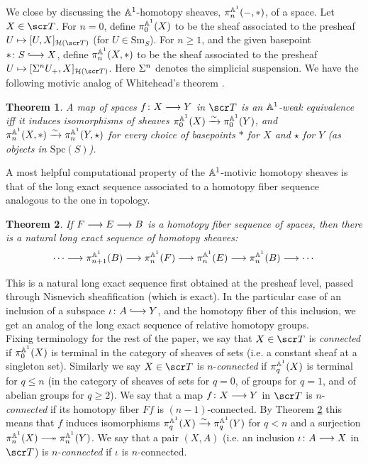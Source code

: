 \documentclass{amsart}
\newtheorem{thm}{Theorem}[section]
\theoremstyle{definition}
\begin{document}
We close by discussing the $\mathbb{A}^1$-homotopy sheaves, $\pi^{\mathbb{A}^1}_n(-,*)$, of a space. Let $X \in \sT$. For $n=0$, define $\pi_0^{\mathbb{A}^1}(X)$ to be the sheaf associated to the presheaf $U \mapsto [U,X]_{\oH(\sT)}$ (for $U \in \mathrm{Sm}_S$). For $n \geq 1$, and the given basepoint $* \colon S \monoto X$, define $\pi_n^{\mathbb{A}^1}(X,*)$ to be the sheaf associated to the presheaf $U \mapsto [\SI^n U_+, X]_{\oH(\sT)}$. Here $\Sigma^n$ denotes the simplicial suspension. We have the following motivic analog of Whitehead's theorem \cite[Proposition 2.14]{MV99}.

\begin{thm}\label{thm:1.1}
A map of spaces $f \colon X \longrightarrow Y$ in $\sT$ is an $\mathbb{A}^1$-weak equivalence iff it induces isomorphisms of sheaves $\pi_0^{\mathbb{A}^1}(X) \xrightarrow{\sim} \pi_0^{\mathbb{A}^1}(Y)$, and $\pi_n^{\mathbb{A}^1}(X,*) \xrightarrow{\sim} \pi_n^{\mathbb{A}^1}(Y,\star)$ for every choice of basepoints $*$ for $X$ and $\star$ for $Y$ (as objects in $\mathrm{Spc}(S)$). 
\end{thm}

A most helpful computational property of the $\mathbb{A}^1$-motivic homotopy sheaves is that of the long exact sequence associated to a homotopy fiber sequence analogous to the one in topology.

\begin{thm}\label{thm:1.2}
If $F \longrightarrow E \longrightarrow B$ is a homotopy fiber sequence of spaces, then there is a natural long exact sequence of homotopy sheaves:
\[\cdots \longrightarrow \pi^{\mathbb{A}^1}_{n+1}(B) \longrightarrow \pi^{\mathbb{A}^1}_n(F) \longrightarrow \pi_n^{\mathbb{A}^1}(E) \longrightarrow \pi^{\mathbb{A}^1}_n(B) \longrightarrow \cdots\]
\end{thm}

\noindent This is a natural long exact sequence first obtained at the presheaf level, passed through Nisnevich sheafification (which is exact). In the particular case of an inclusion of a subspace $\iota \colon A \monoto Y$, and the homotopy fiber of this inclusion, we get an analog of the long exact sequence of relative homotopy groups.\\

Fixing terminology for the rest of the paper, we say that $X \in \sT$ is \emph{connected} if $\pi_0^{\mathbb{A}^1}(X)$ is terminal in the category of sheaves of sets (i.e. a constant sheaf at a singleton set). Similarly we say $X \in \sT$ is $n$-\emph{connected} if $\pi_q^{\mathbb{A}^1}(X)$ is terminal for $q \leq n$ (in the category of sheaves of sets for $q=0$, of groups for $q=1$, and of abelian groups for $q \geq 2$). We say that a map $f \colon X \longrightarrow Y$ in $\sT$ is $n$-\emph{connected} if its homotopy fiber $Ff$ is $(n-1)$-connected. By Theorem \ref{thm:1.2} this means that $f$ induces isomorphisms $\pi_q^{\mathbb{A}^1}(X) \xrightarrow{\sim} \pi_q^{\mathbb{A}^1}(Y)$ for $q < n$ and a surjection $\pi_n^{\bA^1}(X) \epito \pi_n^{\bA^1}(Y)$. We say that a pair $(X,A)$ (i.e. an inclusion $\iota \colon A \longrightarrow X$ in $\sT$) is $n$-\emph{connected} if $\iota$ is $n$-connected.\\
\end{document}
